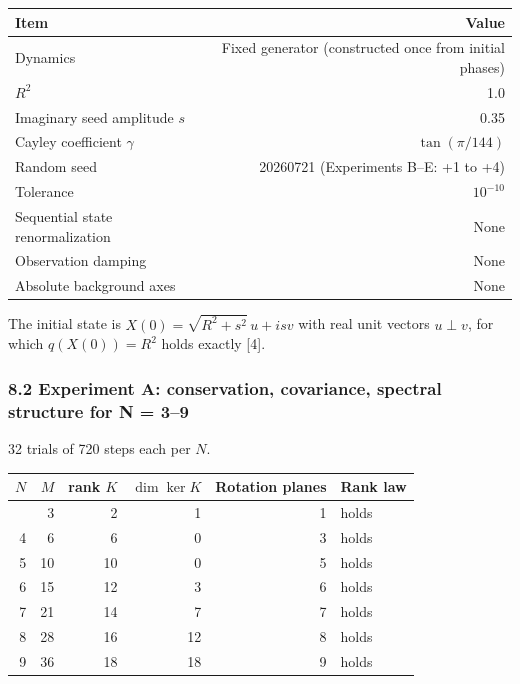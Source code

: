 \documentclass[
  a4paper,
]{article}
\newcounter{none} %
\begin{document}
{\def\LTcaptype{none} %
\begin{longtable}[]{@{}lr@{}}
\toprule\noalign{}
Item & Value \\
\midrule\noalign{}
\endhead
\bottomrule\noalign{}
\endlastfoot
Dynamics & Fixed generator (constructed once from initial phases) \\
\(R^2\) & 1.0 \\
Imaginary seed amplitude \(s\) & 0.35 \\
Cayley coefficient \(\gamma\) & \(\tan(\pi/144)\) \\
Random seed & 20260721 (Experiments B--E: +1 to +4) \\
Tolerance & \(10^{-10}\) \\
Sequential state renormalization & None \\
Observation damping & None \\
Absolute background axes & None \\
\end{longtable}
}

The initial state is \(X(0)=\sqrt{R^2+s^2}\,u+isv\) with real unit
vectors \(u\perp v\), for which \(q(X(0))=R^2\) holds exactly {[}4{]}.

\subsubsection{8.2 Experiment A: conservation, covariance, spectral
structure for N =
3--9}\label{experiment-a-conservation-covariance-spectral-structure-for-n-39}

32 trials of 720 steps each per \(N\).

{\def\LTcaptype{none} %
\begin{longtable}[]{@{}rrrrrl@{}}
\toprule\noalign{}
\(N\) & \(M\) & rank \(K\) & \(\dim\ker K\) & Rotation planes & Rank
law \\
\midrule\noalign{}
\endhead
\bottomrule\noalign{}
\endlastfoot
3 & 3 & 2 & 1 & 1 & holds \\
4 & 6 & 6 & 0 & 3 & holds \\
5 & 10 & 10 & 0 & 5 & holds \\
6 & 15 & 12 & 3 & 6 & holds \\
7 & 21 & 14 & 7 & 7 & holds \\
8 & 28 & 16 & 12 & 8 & holds \\
9 & 36 & 18 & 18 & 9 & holds \\
\end{longtable}
}
\end{document}
